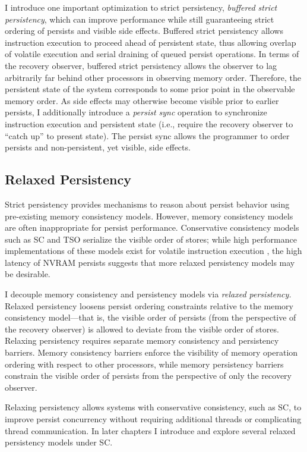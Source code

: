I introduce one important optimization to strict persistency, \emph{buffered strict persistency}, which can improve performance while still guaranteeing strict ordering of persists and visible side effects.  
Buffered strict persistency allows instruction execution to proceed ahead of persistent state, thus allowing overlap of volatile execution and serial draining of queued persist operations.
In terms of the recovery observer, buffered strict persistency allows the observer to lag arbitrarily far behind other processors in observing memory order.
Therefore, the persistent state of the system corresponds to some prior point in the observable memory order.
As side effects may otherwise become visible prior to earlier persists, I additionally introduce a \emph{persist sync} operation to synchronize instruction execution and persistent state (i.e., require the recovery observer to ``catch up'' to present state). 
The persist sync allows the programmer to order persists and non-persistent, yet visible, side effects.

\subsection{Relaxed Persistency}

Strict persistency provides mechanisms to reason about persist behavior using pre-existing memory consistency models.
However, memory consistency models are often inappropriate for persist performance.
Conservative consistency models such as SC and TSO serialize the visible order of stores; while high performance implementations of these models exist for volatile instruction execution \cite{Singh12,Lin12}, the high latency of NVRAM persists suggests that more relaxed persistency models may be desirable.

I decouple memory consistency and persistency models via \emph{relaxed persistency.}
Relaxed persistency loosens persist ordering constraints relative to the memory consistency model---that is, the visible order of persists (from the perspective of the recovery observer) is allowed to deviate from the visible order of stores.
Relaxing persistency requires separate memory consistency and persistency barriers.
Memory consistency barriers enforce the visibility of memory operation ordering with respect to other processors, while memory persistency barriers constrain the visible order of persists from the perspective of only the recovery observer.

Relaxing persistency allows systems with conservative consistency, such as SC, to improve persist concurrency without requiring additional threads or complicating thread communication.
In later chapters I introduce and explore several relaxed persistency models under SC.

